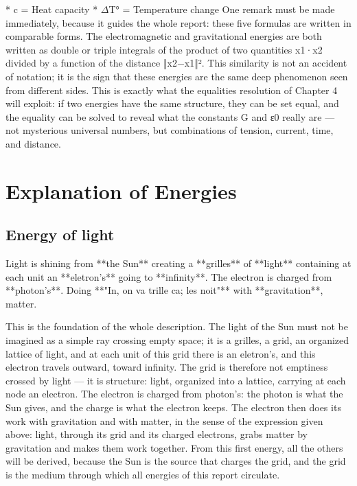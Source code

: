 \documentclass[12pt, letterpaper]{article}
\begin{document}
\begin{enumerate}
		* c = Heat capacity \newline
		* $\Delta$T° = Temperature change\newline
		One remark must be made immediately, because it guides the whole report: these five formulas are written in comparable forms. The electromagnetic and gravitational energies are both written as double or triple integrals of the product of two quantities x1·x2 divided by a function of the distance ‖x2−x1‖². This similarity is not an accident of notation; it is the sign that these energies are the same deep phenomenon seen from different sides. This is exactly what the equalities resolution of Chapter 4 will exploit: if two energies have the same structure, they can be set equal, and the equality can be solved to reveal what the constants G and ε0 really are — not mysterious universal numbers, but combinations of tension, current, time, and distance.
		
	\end{enumerate}
	\chapter{Explanation of Energies}
	\section{Energy of light}
Light is shining from **the Sun** creating a **grilles** of **light** containing at each unit an **eletron's** going to **infinity**. The electron is charged from **photon's**. Doing **"In, on va trille ca; les noit"** with **gravitation**, matter.

This is the foundation of the whole description. The light of the Sun must not be imagined as a simple ray crossing empty space; it is a grilles, a grid, an organized lattice of light, and at each unit of this grid there is an eletron's, and this electron travels outward, toward infinity. The grid is therefore not emptiness crossed by light — it is structure: light, organized into a lattice, carrying at each node an electron. The electron is charged from photon's: the photon is what the Sun gives, and the charge is what the electron keeps. The electron then does its work with gravitation and with matter, in the sense of the expression given above: light, through its grid and its charged electrons, grabs matter by gravitation and makes them work together. From this first energy, all the others will be derived, because the Sun is the source that charges the grid, and the grid is the medium through which all energies of this report circulate.
	
\end{document}
